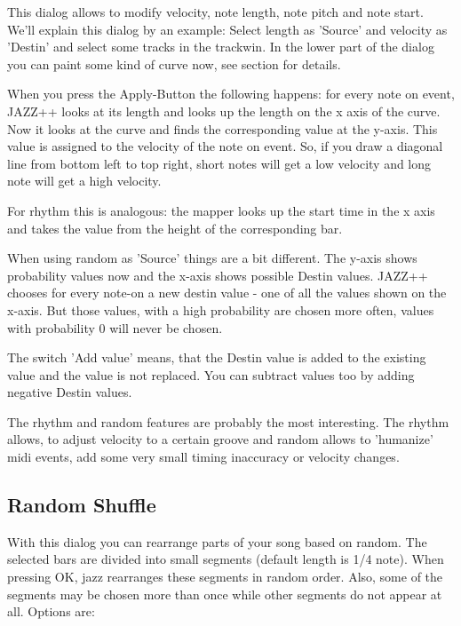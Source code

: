 \documentclass[letterpaper]{report}
\begin{document}
This dialog allows to modify velocity, note length, note pitch and note start.
We'll explain this dialog by an example: Select length as 'Source' and velocity
as 'Destin' and select some tracks in the trackwin. In the lower part of the
dialog you can paint some kind of curve now, see section  for details.

When you press the Apply-Button
the following happens: for every note on event, JAZZ++ looks at its length and
looks up the length on the x axis of the curve. Now it looks at the curve and
finds the corresponding value at the y-axis. This value is assigned to the
velocity of the note on event. So, if you draw a diagonal line from bottom
left to top right, short notes will get a low velocity and long note will get
a high velocity.

For rhythm this is analogous: the mapper looks up the start time in the x axis
and takes the value from the height of the corresponding bar.

When using random as 'Source' things are a bit different. The y-axis shows
probability values now and the x-axis shows possible Destin values.
JAZZ++ chooses for every note-on a new destin value - one of all the values
shown on the x-axis. But those values, with a high probability are chosen
more often, values with probability 0 will never be chosen.

The switch 'Add value' means, that the Destin value is added to the existing
value and the value is not replaced. You can subtract values too by adding
negative Destin values.

The rhythm and random features are probably the most interesting. The rhythm
allows, to adjust velocity to a certain groove and random allows to 'humanize'
midi events, add some very small timing inaccuracy or velocity changes.



\subsection{Random Shuffle}\label{shuffle}


With this dialog you can rearrange parts of your song based on random. The
selected bars are divided into small segments (default length is 1/4 note).
When pressing OK, jazz rearranges these segments in random order. Also,
some of the segments may be chosen more than once while other segments do
not appear at all. Options are:
\end{document}
